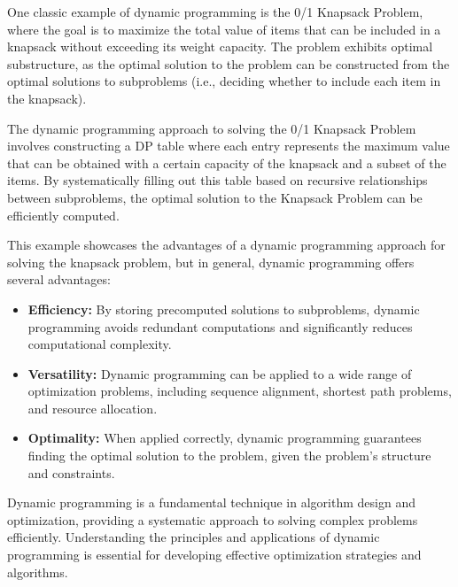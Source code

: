 \documentclass[11pt]{report}
\begin{document}
        One classic example of dynamic programming is the 0/1 Knapsack Problem, where the goal is to maximize the total value of items that can be included in a knapsack without exceeding its weight capacity. The problem exhibits optimal substructure, as the optimal solution to the problem can be constructed from the optimal solutions to subproblems (i.e., deciding whether to include each item in the knapsack).
        
        The dynamic programming approach to solving the 0/1 Knapsack Problem involves constructing a DP table where each entry represents the maximum value that can be obtained with a certain capacity of the knapsack and a subset of the items. By systematically filling out this table based on recursive relationships between subproblems, the optimal solution to the Knapsack Problem can be efficiently computed.

        This example showcases the advantages of a dynamic programming approach for solving the knapsack problem, but in general, dynamic programming offers several advantages:

        \begin{itemize}
            \item \textbf{Efficiency:} By storing precomputed solutions to subproblems, dynamic programming avoids redundant computations and significantly reduces computational complexity.
        
            \item \textbf{Versatility:} Dynamic programming can be applied to a wide range of optimization problems, including sequence alignment, shortest path problems, and resource allocation.
        
            \item \textbf{Optimality:} When applied correctly, dynamic programming guarantees finding the optimal solution to the problem, given the problem's structure and constraints.
        \end{itemize}
        
        Dynamic programming is a fundamental technique in algorithm design and optimization, providing a systematic approach to solving complex problems efficiently. Understanding the principles and applications of dynamic programming is essential for developing effective optimization strategies and algorithms.
\end{document}
